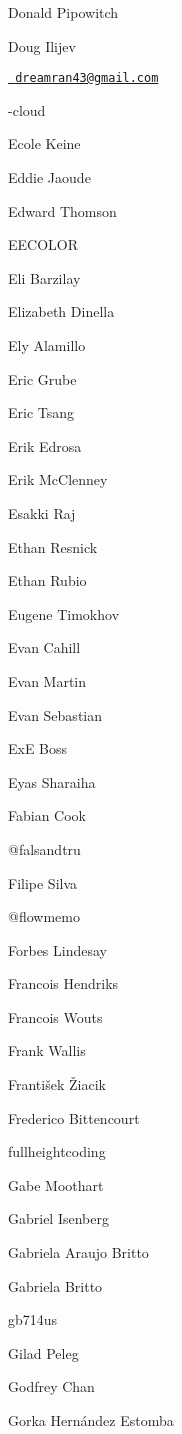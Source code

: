 \begin{DoxyItemize}
\item Donald Pipowitch
\item Doug Ilijev
\item \href{mailto:dreamran43@gmail.com}{\texttt{ dreamran43@gmail.\+com}}
\item {\itshape }-\/cloud
\item Ecole Keine
\item Eddie Jaoude
\item Edward Thomson
\item EECOLOR
\item Eli Barzilay
\item Elizabeth Dinella
\item Ely Alamillo
\item Eric Grube
\item Eric Tsang
\item Erik Edrosa
\item Erik Mc\+Clenney
\item Esakki Raj
\item Ethan Resnick
\item Ethan Rubio
\item Eugene Timokhov
\item Evan Cahill
\item Evan Martin
\item Evan Sebastian
\item ExE Boss
\item Eyas Sharaiha
\item Fabian Cook
\item @falsandtru
\item Filipe Silva
\item @flowmemo
\item Forbes Lindesay
\item Francois Hendriks
\item Francois Wouts
\item Frank Wallis
\item František Žiacik
\item Frederico Bittencourt
\item fullheightcoding
\item Gabe Moothart
\item Gabriel Isenberg
\item Gabriela Araujo Britto
\item Gabriela Britto
\item gb714us
\item Gilad Peleg
\item Godfrey Chan
\item Gorka Hernández Estomba

\end{DoxyItemize}

